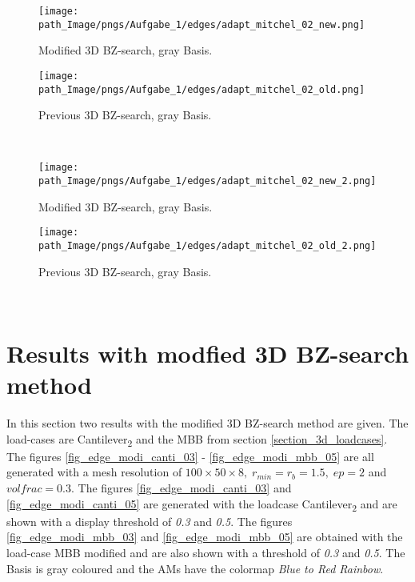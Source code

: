 \begin{figure}[!h]
\begin{minipage}{0.45\textwidth}
\centering
 \texttt{[image: path\_Image/pngs/Aufgabe\_1/edges/adapt\_mitchel\_02\_new.png]}
	\caption{Modified 3D BZ-search, gray Basis.} 
	\label{fig_edge_3d_micth_modi}
\end{minipage}
\hfill
\begin{minipage}{0.45\textwidth}
\centering
 \texttt{[image: path\_Image/pngs/Aufgabe\_1/edges/adapt\_mitchel\_02\_old.png]}
	\caption{Previous 3D BZ-search, gray Basis.} 
	\label{fig_edge_3d_micth_ohne}
\end{minipage}\\

\vspace{0.75cm}
\begin{minipage}{0.45\textwidth}
\centering
 \texttt{[image: path\_Image/pngs/Aufgabe\_1/edges/adapt\_mitchel\_02\_new\_2.png]}
	\caption{Modified 3D BZ-search, gray Basis.} 
	\label{fig_edge_3d_micth2_modi}
\end{minipage}
\hfill
\begin{minipage}{0.45\textwidth}
\centering
 \texttt{[image: path\_Image/pngs/Aufgabe\_1/edges/adapt\_mitchel\_02\_old\_2.png]}
	\caption{Previous 3D BZ-search, gray Basis.} 
	\label{fig_edge_3d_micth2_ohne}
\end{minipage}
\end{figure}~\\


\section{Results with modfied 3D BZ-search method}
\label{section_results_modified_3D_BZ_search}
In this section two results with the modified 3D BZ-search method are given. The
 load-cases are Cantilever\textsubscript{2} and the MBB from section
 \ref{section_3d_loadcases}. The figures
 \ref{fig_edge_modi_canti_03} - \ref{fig_edge_modi_mbb_05} are all
 generated with a mesh resolution of $100 \times 50 \times 8, 
 \; r_{min} = r_b = 1.5, 
 \; ep = 2$ and $volfrac = 0.3$. 
 The figures \ref{fig_edge_modi_canti_03} and \ref{fig_edge_modi_canti_05} are
	generated with the loadcase Cantilever\textsubscript{2} and are 
 shown with a display threshold of \emph{0.3} and \emph{0.5}.
 The figures \ref{fig_edge_modi_mbb_03} and 
 \ref{fig_edge_modi_mbb_05} are obtained with the load-case 
 MBB modified and are also shown 
 with a threshold of \emph{0.3} and \emph{0.5}. The
 Basis is gray coloured and the AMs have the colormap
 \emph{Blue to Red Rainbow}.

